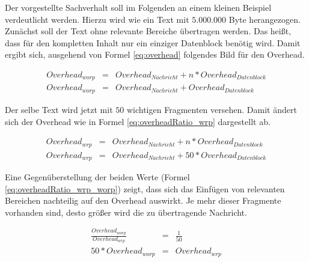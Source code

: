 Der vorgestellte Sachverhalt soll im Folgenden an einem kleinen Beispiel
verdeutlicht werden. Hierzu wird wie ein Text mit $5.000.000$ Byte herangezogen.
Zunächst soll der Text ohne relevante Bereiche übertragen werden. Das heißt,
dass für den kompletten Inhalt nur ein einziger Datenblock benötig wird. Damit
ergibt sich, ausgehend von Formel \ref{eq:overhead} folgendes Bild für den
Overhead.

\begin{eqnarray} 
	Overhead_{worp} & = & Overhead_{Nachricht} + n * Overhead_{Datenblock} \\
	Overhead_{worp} & = & Overhead_{Nachricht} + Overhead_{Datenblock}
	\label{eq:overheadRatio_worp}
\end{eqnarray}

Der selbe Text wird jetzt mit $50$ wichtigen Fragmenten versehen. Damit ändert
sich der Overhead wie in Formel \ref{eq:overheadRatio_wrp} dargestellt ab. 

\begin{eqnarray} 
	Overhead_{wrp} & = & Overhead_{Nachricht} + n * Overhead_{Datenblock} \\
	Overhead_{wrp} & = & Overhead_{Nachricht} + 50 * Overhead_{Datenblock}
	\label{eq:overheadRatio_wrp}
\end{eqnarray}

Eine Gegenüberstellung der beiden Werte (Formel \ref{eq:overheadRatio_wrp_worp})
zeigt, dass sich das Einfügen von relevanten Bereichen nachteilig auf den
Overhead auswirkt. Je mehr dieser Fragmente vorhanden sind, desto größer wird
die zu übertragende Nachricht.

\begin{eqnarray} 
	\frac{ Overhead_{worp} }{ Overhead_{wrp} } & = & \frac{1}{50} \\
	50 * Overhead_{worp} & = & Overhead_{wrp} 
	\label{eq:overheadRatio_wrp_worp}
\end{eqnarray}